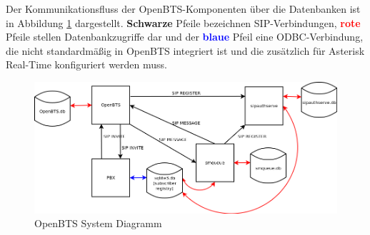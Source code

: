 Der Kommunikationsfluss der OpenBTS-Komponenten über die Datenbanken ist in Abbildung \ref{fig:openbts_system_diagram} dargestellt. \textbf{Schwarze} Pfeile bezeichnen SIP-Verbindungen, \textcolor{red}{\textbf{rote}} Pfeile stellen Datenbankzugriffe dar und der \textcolor{blue}{\textbf{blaue}} Pfeil eine ODBC-Verbindung, die nicht standardmäßig in OpenBTS integriert ist und die zusätzlich für Asterisk Real-Time konfiguriert werden muss.
\begin{figure}[htbp]
	\centering
		\includegraphics[width=1.00\textwidth]{includes/openbts_system_diagram}
	\caption{OpenBTS System Diagramm}
	\label{fig:openbts_system_diagram}
\end{figure}

\newpage